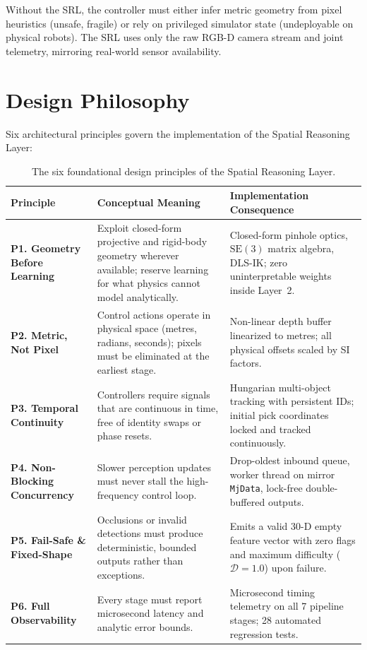 \documentclass[10pt,a4paper]{article}
\begin{document}
\begin{summarybox}
Without the SRL, the controller must either infer metric geometry from pixel heuristics (unsafe, fragile) or rely on privileged simulator state (undeployable on physical robots). The SRL uses only the raw RGB-D camera stream and joint telemetry, mirroring real-world sensor availability.
\end{summarybox}

\section{Design Philosophy}
Six architectural principles govern the implementation of the Spatial Reasoning Layer:

\begin{table}[h]
\centering
\small
\begin{tabularx}{\linewidth}{p{3.2cm}p{5.5cm}X}
\toprule
\textbf{Principle} & \textbf{Conceptual Meaning} & \textbf{Implementation Consequence} \\
\midrule
\textbf{P1. Geometry Before Learning} & Exploit closed-form projective and rigid-body geometry wherever available; reserve learning for what physics cannot model analytically. & Closed-form pinhole optics, $\mathrm{SE}(3)$ matrix algebra, DLS-IK; zero uninterpretable weights inside Layer~2. \\
\addlinespace
\textbf{P2. Metric, Not Pixel} & Control actions operate in physical space (metres, radians, seconds); pixels must be eliminated at the earliest stage. & Non-linear depth buffer linearized to metres; all physical offsets scaled by SI factors. \\
\addlinespace
\textbf{P3. Temporal Continuity} & Controllers require signals that are continuous in time, free of identity swaps or phase resets. & Hungarian multi-object tracking with persistent IDs; initial pick coordinates locked and tracked continuously. \\
\addlinespace
\textbf{P4. Non-Blocking Concurrency} & Slower perception updates must never stall the high-frequency control loop. & Drop-oldest inbound queue, worker thread on mirror \texttt{MjData}, lock-free double-buffered outputs. \\
\addlinespace
\textbf{P5. Fail-Safe \& Fixed-Shape} & Occlusions or invalid detections must produce deterministic, bounded outputs rather than exceptions. & Emits a valid 30-D empty feature vector with zero flags and maximum difficulty ($\mathcal{D}=1.0$) upon failure. \\
\addlinespace
\textbf{P6. Full Observability} & Every stage must report microsecond latency and analytic error bounds. & Microsecond timing telemetry on all 7 pipeline stages; 28 automated regression tests. \\
\bottomrule
\end{tabularx}
\caption{The six foundational design principles of the Spatial Reasoning Layer.}
\label{tab:principles}
\end{table}
\end{document}

